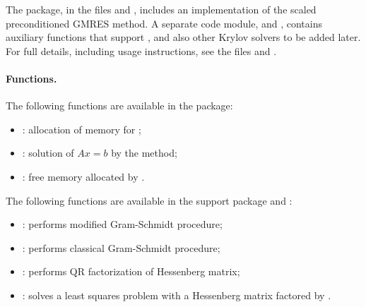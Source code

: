 %
The {\spgmr} package, in the files  and , includes an
implementation of the scaled preconditioned GMRES method.  
A separate code module,  and , contains auxiliary
functions that support {\spgmr}, and also other Krylov solvers to be
added later.  For full details, including usage instructions, see the
files  and .
 
\paragraph{Functions.}
The following functions are available in the {\spgmr} package:  
\begin{itemize}
\item {}: allocation of memory for ;
\item {}: solution of $Ax = b$ by the {\spgmr} method;
\item {}: free memory allocated by .
\end{itemize}
%
The following functions are available in the support package 
 and :
\begin{itemize}
\item {}: performs modified Gram-Schmidt procedure;
\item {}: performs classical Gram-Schmidt procedure; 
\item {}: performs QR factorization of Hessenberg matrix;
\item {}: solves a least squares problem with a Hessenberg
       matrix factored by .
\end{itemize}
